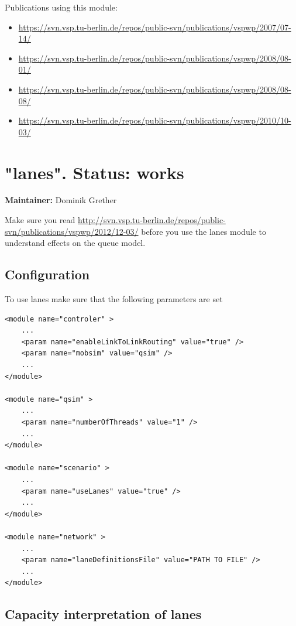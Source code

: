 Publications using this module:
\begin{itemize}
	\item \href{https://svn.vsp.tu-berlin.de/repos/public-svn/publications/vspwp/2007/07-14/}{https://svn.vsp.tu-berlin.de/repos/public-svn/publications/vspwp/2007/07-14/}
	\item \href{https://svn.vsp.tu-berlin.de/repos/public-svn/publications/vspwp/2008/08-01/}{https://svn.vsp.tu-berlin.de/repos/public-svn/publications/vspwp/2008/08-01/}
	\item \href{https://svn.vsp.tu-berlin.de/repos/public-svn/publications/vspwp/2008/08-08/}{https://svn.vsp.tu-berlin.de/repos/public-svn/publications/vspwp/2008/08-08/}
	\item \href{https://svn.vsp.tu-berlin.de/repos/public-svn/publications/vspwp/2010/10-03/}{https://svn.vsp.tu-berlin.de/repos/public-svn/publications/vspwp/2010/10-03/}
\end{itemize}


\vfill\eject
\section{"lanes". Status: works}

\textbf{Maintainer:} Dominik Grether

Make sure you read \url{http://svn.vsp.tu-berlin.de/repos/public-svn/publications/vspwp/2012/12-03/} before you use the lanes module to understand effects on the queue model.

\subsection{Configuration}

To use lanes make sure that the following parameters are set

\begin{verbatim}
<module name="controler" >	
	...
	<param name="enableLinkToLinkRouting" value="true" />
	<param name="mobsim" value="qsim" />
	...
</module>

<module name="qsim" >
	...
	<param name="numberOfThreads" value="1" />
	...
</module>

<module name="scenario" >
	...
	<param name="useLanes" value="true" />
	...
</module>

<module name="network" >
	...
	<param name="laneDefinitionsFile" value="PATH TO FILE" />
	...
</module>
\end{verbatim}

\subsection{Capacity interpretation of lanes}

